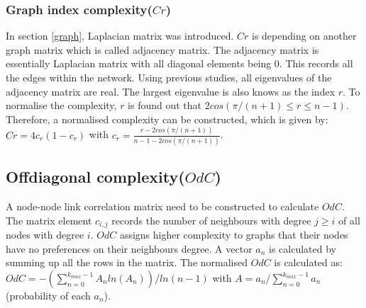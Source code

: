 \documentclass[12pt]{article}
\begin{document}
\subsubsection{Graph index complexity($Cr$)}
In section \ref{graph}, Laplacian matrix was introduced. $Cr$ is depending on another graph matrix which is called adjacency matrix. The adjacency matrix is essentially Laplacian matrix with all diagonal elements being 0. This records all the edges within the network. Using previous studies, all eigenvalues of the adjacency matrix are real.\cite{brouwer2011spectra} The largest eigenvalue is also knows as the index $r$. To normalise the complexity, $r$ is found out that $2cos(\pi /(n+1) \leq r \leq n-1)$.\cite{brouwer2011spectra} Therefore, a normalised complexity can be constructed, which is given by: $Cr=4c_r(1-c_r)$ with $c_r=\frac{r-2cos(\pi /(n+1))}{n-1-2cos(\pi /(n+1))}$.

\subsection{Offdiagonal complexity($OdC$)}
A node-node link correlation matrix need to be constructed to calculate $OdC$.\cite{odc} The matrix element $c_{i,j}$ records the number of neighbours with degree $j \geq i$ of all nodes with degree $i$. $OdC$ assigns higher complexity to graphs that their nodes have no preferences on their neighbours degree. A vector $a_n$ is calculated by summing up all the rows in the matrix. The normalised $OdC$ is calculated as:\\
$OdC=-(\sum^{k_{max}-1}_{n=0}A_nln(A_n))/ln(n-1)$ with $A=a_n/\sum_{n=0}^{k_{max}-1}a_n$(probability of each $a_n$).
\end{document}
